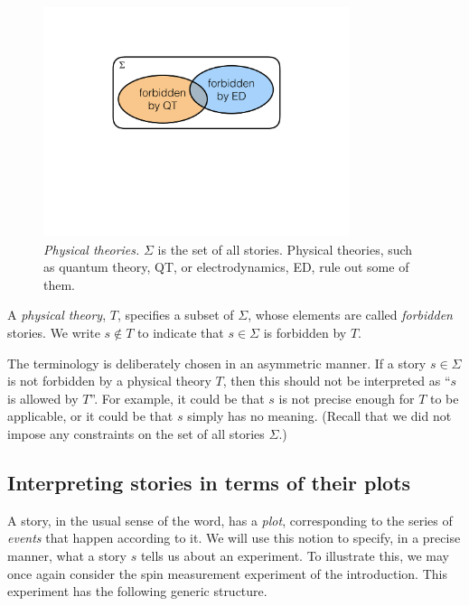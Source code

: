 \documentclass{article}
\theoremstyle{plain}
\theoremstyle{definition}
\begin{document}
\begin{figure}[t]
\centering
\includegraphics[trim= 0.4cm  12.5cm 0cm 5.5cm, clip=true, width=0.8\textwidth]{Theories.pdf}
\caption{\emph{Physical theories.}  $\Sigma$ is the set of all stories. Physical theories, such as quantum theory, QT, or electrodynamics, ED, rule out some of them. 
\label{fig_theories}
}
\end{figure}
  
 \begin{shaded}
 \noindent A \emph{physical theory}, $T$, specifies a subset of $\Sigma$, whose elements are called \emph{forbidden} stories. We write $s \notin T$ to indicate that $s \in \Sigma$ is forbidden by $T$.
\end{shaded}

The terminology is deliberately chosen in an asymmetric manner.   If a story $s \in \Sigma$ is not forbidden by a physical theory $T$, then this should not be interpreted as ``$s$ is allowed by $T$''.  For example, it could be that $s$ is not precise enough for $T$ to be applicable, or it could be that $s$  simply has no meaning. (Recall that we did not impose any constraints on the set of all stories $\Sigma$.)

\subsection{Interpreting stories in terms of their plots} \label{sec_plots}

A story, in the usual sense of the word, has a \emph{plot}, corresponding to the series of \emph{events} that happen according to it.  We will use this notion to specify, in a precise manner, what a story $s$ tells us about an experiment. To illustrate this, we may once again consider the spin measurement experiment of the introduction. This experiment has the following generic structure. 
\end{document}
